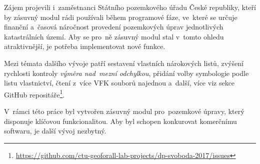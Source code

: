 Zájem projevili i~zaměstnanci Státního pozemkového úřadu České republiky, kteří by zásuvný modul rádi používali během programové fáze, ve~které se určuje finanční a~časová náročnost provedení pozemkových úprav jednotlivých katastrálních území. Aby se pro~ně zásuvný modul stal v~tomto ohledu atraktivnější, je potřeba implementovat nové funkce.

Mezi témata dalšího vývoje patří sestavení vlastních nárokových listů, zvýšení rychlosti kontroly \textit{výměra nad~mezní odchylkou}, přidání volby symbologie podle listu vlastnictví, čtení z~více VFK souborů najednou a~další, více viz sekce GitHub repositáře\footnote{\url{https://github.com/ctu-geoforall-lab-projects/dp-svoboda-2017/issues}}.

V~rámci této práce byl vytvořen zásuvný modul pro~pozemkové úpravy, který disponuje klíčovou funkcionalitou. Aby byl schopen konkurovat komerčnímu softwaru, je další vývoj nezbytný.
